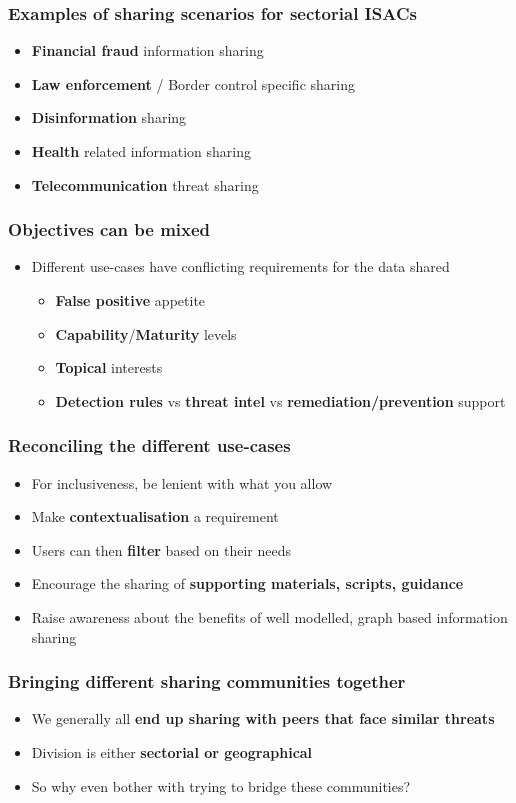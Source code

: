 \begin{frame}
	\frametitle{Examples of sharing scenarios for sectorial ISACs}
	\begin{itemize}
		\item \textbf{Financial fraud} information sharing
		\item \textbf{Law enforcement} / Border control specific sharing
		\item \textbf{Disinformation} sharing
		\item \textbf{Health} related information sharing
		\item \textbf{Telecommunication} threat sharing
	\end{itemize}
\end{frame}

\begin{frame}
	\frametitle{Objectives can be mixed}
	\begin{itemize}
		\item Different use-cases have conflicting requirements for the data shared
		\begin{itemize}
			\item \textbf{False positive} appetite
			\item \textbf{Capability}/\textbf{Maturity} levels
			\item \textbf{Topical} interests
			\item \textbf{Detection rules} vs \textbf{threat intel} vs \textbf{remediation/prevention} support
		\end{itemize}
	\end{itemize}
\end{frame}

\begin{frame}
	\frametitle{Reconciling the different use-cases}
	\begin{itemize}
		\item For inclusiveness, be lenient with what you allow
		\item Make \textbf{contextualisation} a requirement
		\item Users can then \textbf{filter} based on their needs
		\item Encourage the sharing of \textbf{supporting materials, scripts, guidance}
		\item Raise awareness about the benefits of well modelled, graph based information sharing
	\end{itemize}
\end{frame}

\begin{frame}
	\frametitle{Bringing different sharing communities together}
	\begin{itemize}
		\item We generally all \textbf{end up sharing with peers that face similar threats}
		\item Division is either \textbf{sectorial or geographical}
		\item So why even bother with trying to bridge these communities?
	\end{itemize}
\end{frame}

